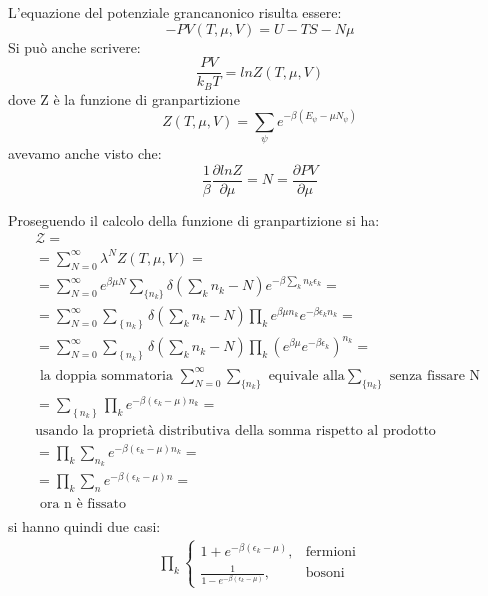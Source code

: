 L'equazione del potenziale grancanonico risulta essere:
\begin{equation}
-PV(T,\mu,V)= U-TS-N\mu 
\end{equation}
Si può anche scrivere:
\begin{equation}
\dfrac{PV}{k_{B}T}=lnZ(T,\mu,V)
\end{equation}
dove Z è la funzione di granpartizione
\begin{equation}
Z(T,\mu,V)=\sum_{\psi} e^{-\beta(E_{\psi}-\mu N_{\psi})}
\end{equation}
avevamo anche visto che:
\begin{equation}
\dfrac{1}{\beta} \dfrac{\partial lnZ}{\partial \mu }= N =\dfrac{\partial PV}{\partial \mu }
\end{equation}

Proseguendo il calcolo della funzione di granpartizione si ha:
\begin{equation}\begin{split}
\mathcal{Z}=\\
=\sum_{N=0}^{\infty }\lambda^{N} Z(T,\mu,V)=\\
=\sum_{N=0}^{\infty } e^{ \beta\mu N} \sum_{\{n_{k}\}} {\delta\left(\sum_{k}{n_k-N}\right)} e^{-\beta \sum_{k} n_{k}\epsilon_{k} }  =\\
=\sum_{N=0}^{\infty }{\sum_{\left\{n_k\right\}}{\delta\left(\sum_{k}{n_k-N}\right)}\prod_{k}{e^{\beta\mu n_k}e^{-\beta\epsilon_k n_k}}}=\\
=\sum_{N=0}^{\infty }{\sum_{\left\{n_k\right\}}{\delta\left(\sum_k{n_k-N}\right)}\prod_k{\left(e^{\beta\mu}e^{-\beta\epsilon_k}\right)^{n_k}}}=\\
\textrm{ la doppia sommatoria } \sum_{N=0}^{\infty } \sum_{\{n_{k}\}}  
\textrm{ equivale alla} \sum_{\{n_{k}\}} \textrm{ senza fissare N  } \\ 
=\sum_{\left\{n_k\right\}}{\prod_{k}{e^{-\beta\left(\epsilon_k-\mu\right)n_k}}}=\\
\textrm{usando la proprietà distributiva della somma rispetto al prodotto} \\
=\prod_k{\sum_{n_k}{e^{-\beta\left(\epsilon_k-\mu\right)n_k}}}=\\
=\prod_k{\sum_n{e^{-\beta\left(\epsilon_k-\mu\right)n}}}=\\
\textrm{ ora n è fissato } \\
\end{split}\end{equation}
si hanno quindi due casi:
\begin{equation}\begin{split}
\prod_k
\begin{cases}
1+e^{-\beta\left(\epsilon_k-\mu\right)}, & \textrm{fermioni} \\
\frac{1}{1-e^{-\beta\left(\epsilon_k-\mu\right)}}, & \textrm{bosoni}
\end{cases}
\end{split}\end{equation}
